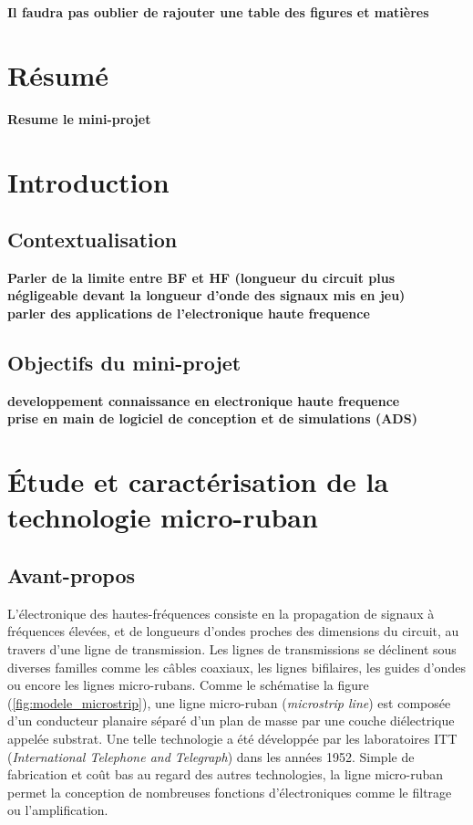 \documentclass[french]{article}
\begin{document}
\newpage
\pagestyle{plain} %

\textbf{Il faudra pas oublier de rajouter une table des figures et matières}

\section{Résumé}
\textbf{Resume le mini-projet}

\section{Introduction}
\subsection{Contextualisation}
\textbf{Parler de la limite entre BF et HF (longueur du circuit plus négligeable devant la longueur d'onde des signaux mis en jeu)\\
parler des applications de l'electronique haute frequence}
\subsection{Objectifs du mini-projet}
\textbf{developpement connaissance en electronique haute frequence\\
prise en main de logiciel de conception et de simulations (ADS)}

\newpage

\section{Étude et caractérisation de la technologie micro-ruban}

\subsection{Avant-propos}

L'électronique des hautes-fréquences consiste en la propagation de signaux à fréquences élevées, et de longueurs d'ondes proches des dimensions du circuit, au travers d'une ligne de transmission. Les lignes de transmissions se déclinent sous diverses familles comme les câbles coaxiaux, les lignes bifilaires, les guides d'ondes ou encore les lignes micro-rubans. Comme le schématise la figure (\ref{fig:modele_microstrip}), une ligne micro-ruban (\textit{microstrip line}) est composée d'un conducteur planaire séparé d'un plan de masse par une couche diélectrique appelée substrat. Une telle technologie a été développée par les laboratoires ITT (\textit{International Telephone and Telegraph}) dans les années 1952. Simple de fabrication et coût bas au regard des autres technologies, la ligne micro-ruban permet la conception de nombreuses fonctions d'électroniques comme le filtrage ou l'amplification.
\end{document}
